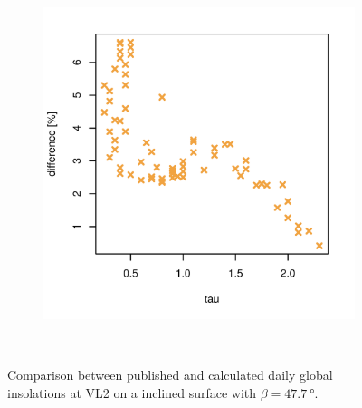 \begin{figure}[H]
\begin{subfigure}[t]{\subfigureWidth}
            \includegraphics[height=\graphicsHeight]{sections/appendix/A/plots/h-diff-bet-exp-calc-at-vl2-with-beta-477-deg.png}
            \label{fig:sub:comparative-global-insolation-at-vl2-beta-equals-phi-percentage-differences}
    \end{subfigure}\\[0.8ex]
    \caption{Comparison between published and calculated daily global insolations at \ac{VL2} on a inclined surface with $\beta=\SI{47.7}{\degree}$.}
    \label{fig:plot:comparative-global-insolation-at-vl2-beta-equals-phi}
\vspace{-2ex}
\end{figure}
